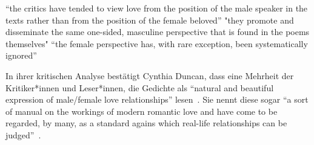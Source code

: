 ``the critics have tended to view love from the position of the male speaker in the texts rather than from the position of the female beloved''
"they promote and disseminate the same one-sided, masculine perspective that is found in the poems themselves"
``the female perspective has, with rare exception, been systematically ignored''

In ihrer kritischen Analyse bestätigt Cynthia Duncan, dass eine Mehrheit der Kritiker*innen und Leser*innen, die Gedichte als ``natural and beautiful expression of male/female love relationships'' lesen~\cite{Duncan1992}.
Sie nennt diese sogar %
``a sort of manual on the workings of modern romantic love and have come to be regarded, by many, as a standard agains which real-life relationships can be judged''~\cite{Duncan1992}.

